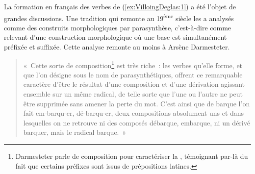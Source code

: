 \documentclass[output=paper]{langsci/langscibook}
\begin{document}
La formation en français des verbes de (\ref{ex:VilloingDeglas:1}) a été l'objet de grandes
discussions. Une tradition qui remonte au 19\textsuperscript{ème} siècle
les a analysés comme des construits morphologiques par parasynthèse,
c'est-à-dire comme relevant d'une construction morphologique où une base
est simultanément préfixée et suffixée. Cette analyse remonte au moins à
Arsène Darmesteter.

\begin{quotation}
«~Cette sorte de composition\footnote{Darmesteter parle
  de composition pour caractériser la , témoignant par-là du
  fait que certains préfixes sont issus de prépositions latines.} est
très riche~: les verbes qu'elle forme, et que l'on désigne sous le nom
de parasynthétiques, offrent ce remarquable caractère d'être le résultat
d'une composition et d'une dérivation agissant ensemble sur un même
radical, de telle sorte que l'une ou l'autre ne peut être supprimée sans
amener la perte du mot. C'est ainsi que de barque l'on fait em-barqu-er,
dé-barqu-er, deux compositions absolument uns et dans lesquelles on ne
retrouve ni des composés débarque, embarque, ni un dérivé barquer, mais
le radical barque.~» %
\citet[24]{darmesteter1894.traite-formation}%
%
\end{quotation}
\end{document}
